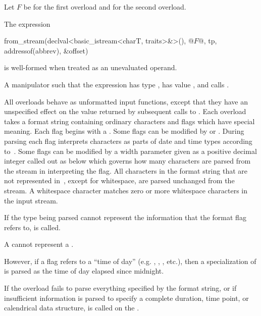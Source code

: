 \begin{itemdescr}
\pnum
Let $F$ be  for the first overload and
 for the second overload.

\pnum
\constraints
The expression
\begin{codeblock}
from_stream(declval<basic_istream<charT, traits>&>(),
            @$F$@, tp, addressof(abbrev), &offset)
\end{codeblock}
is well-formed when treated as an unevaluated operand.

\pnum
\returns
A manipulator such that
the expression 
has type ,
has value , and
calls .
\end{itemdescr}

\pnum
All  overloads behave as unformatted input functions,
except that they have an unspecified effect
on the value returned by subsequent calls to .
Each overload takes a format string containing ordinary characters
and flags which have special meaning.
Each flag begins with a \tcode{\%}.
Some flags can be modified by  or .
During parsing each flag interprets characters as parts of date and time types
according to~.
Some flags can be modified by a width parameter
given as a positive decimal integer called out as  below
which governs how many characters are parsed from the stream in interpreting the flag.
All characters in the format string that are not represented in~,
except for whitespace, are parsed unchanged from the stream.
A whitespace character matches zero or more whitespace characters in the input stream.

\pnum
If the type being parsed cannot represent
the information that the format flag refers to,
 is called.
\begin{example}
A  cannot represent a .
\end{example}
However, if a flag refers to a ``time of day''
(e.g. , , , etc.),
then a specialization of  is parsed as
the time of day elapsed since midnight.

\pnum
If the  overload fails to parse
everything specified by the format string,
or if insufficient information is parsed to specify a complete
duration, time point, or calendrical data structure,
is called on the .

